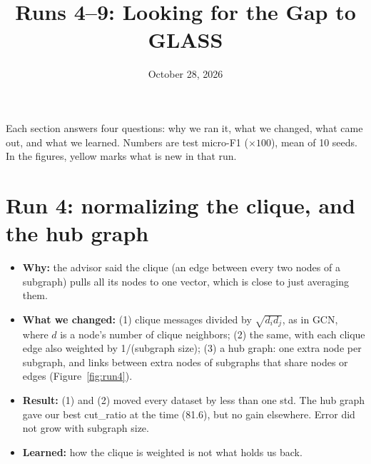 \documentclass[11pt]{article}
\title{Runs 4--9: Looking for the Gap to GLASS}
\author{}
\date{October 28, 2026}
\begin{document}
\maketitle

Each section answers four questions: why we ran it, what we changed, what came out, and what we
learned. Numbers are test micro-F1 ($\times 100$), mean of 10 seeds. In the figures, yellow marks
what is new in that run.

\section*{Run 4: normalizing the clique, and the hub graph}
\begin{itemize}
  \item \textbf{Why:} the advisor said the clique (an edge between every two nodes of a subgraph) pulls all its nodes to one vector, which is close to just averaging them.
  \item \textbf{What we changed:} (1) clique messages divided by $\sqrt{d_i d_j}$, as in GCN, where $d$ is a node's number of clique neighbors; (2) the same, with each clique edge also weighted by 1/(subgraph size); (3) a hub graph: one extra node per subgraph, and links between extra nodes of subgraphs that share nodes or edges (Figure~\ref{fig:run4}).
  \item \textbf{Result:} (1) and (2) moved every dataset by less than one std. The hub graph gave our best cut\_ratio at the time (81.6), but no gain elsewhere. Error did not grow with subgraph size.
  \item \textbf{Learned:} how the clique is weighted is not what holds us back.
\end{itemize}
\end{document}
